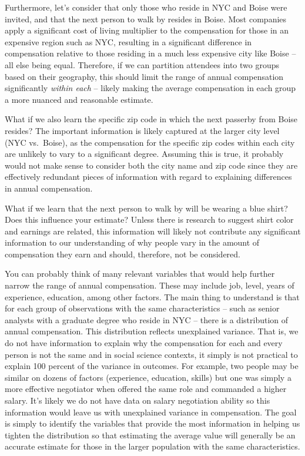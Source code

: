 \documentclass[
]{book}
\begin{document}
Furthermore, let's consider that only those who reside in NYC and Boise were invited, and that the next person to walk by resides in Boise. Most companies apply a significant cost of living multiplier to the compensation for those in an expensive region such as NYC, resulting in a significant difference in compensation relative to those residing in a much less expensive city like Boise -- all else being equal. Therefore, if we can partition attendees into two groups based on their geography, this should limit the range of annual compensation significantly \emph{within each} -- likely making the average compensation in each group a more nuanced and reasonable estimate.

What if we also learn the specific zip code in which the next passerby from Boise resides? The important information is likely captured at the larger city level (NYC vs.~Boise), as the compensation for the specific zip codes within each city are unlikely to vary to a significant degree. Assuming this is true, it probably would not make sense to consider both the city name and zip code since they are effectively redundant pieces of information with regard to explaining differences in annual compensation.

What if we learn that the next person to walk by will be wearing a blue shirt? Does this influence your estimate? Unless there is research to suggest shirt color and earnings are related, this information will likely not contribute any significant information to our understanding of why people vary in the amount of compensation they earn and should, therefore, not be considered.

You can probably think of many relevant variables that would help further narrow the range of annual compensation. These may include job, level, years of experience, education, among other factors. The main thing to understand is that for each group of observations with the same characteristics -- such as senior analysts with a graduate degree who reside in NYC -- there is a distribution of annual compensation. This distribution reflects unexplained variance. That is, we do not have information to explain why the compensation for each and every person is not the same and in social science contexts, it simply is not practical to explain 100 percent of the variance in outcomes. For example, two people may be similar on dozens of factors (experience, education, skills) but one was simply a more effective negotiator when offered the same role and commanded a higher salary. It's likely we do not have data on salary negotiation ability so this information would leave us with unexplained variance in compensation. The goal is simply to identify the variables that provide the most information in helping us tighten the distribution so that estimating the average value will generally be an accurate estimate for those in the larger population with the same characteristics.
\end{document}

